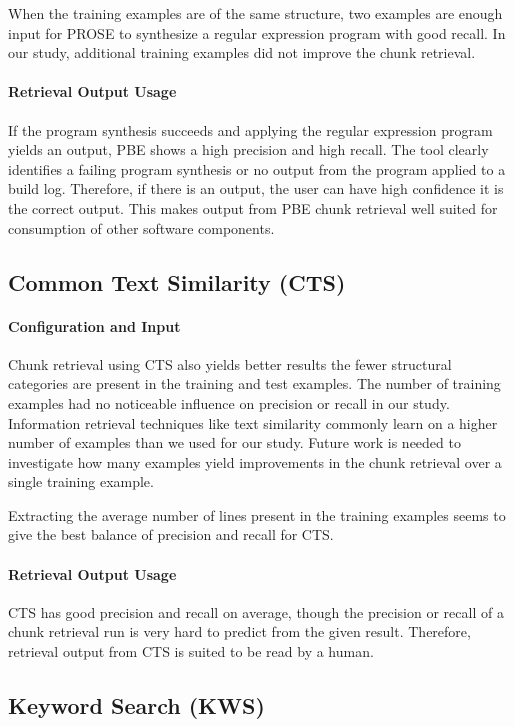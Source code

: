 \documentclass[\myrootdir/main.tex]{subfiles}
\begin{document}
When the training examples are of the same structure, two examples are enough input for PROSE to synthesize a regular expression program with good recall.
In our study, additional training examples did not improve the chunk retrieval.

\paragraph{Retrieval Output Usage}
If the program synthesis succeeds and applying the regular expression program yields an output, PBE shows a high precision and high recall.
The tool clearly identifies a failing program synthesis or no output from the program applied to a build log.
Therefore, if there is an output, the user can have high confidence it is the correct output.
This makes output from PBE chunk retrieval well suited for consumption of other software components.

\subsection{Common Text Similarity (CTS)}
\paragraph{Configuration and Input}
Chunk retrieval using CTS also yields better results the fewer structural categories are present in the training and test examples.
The number of training examples had no noticeable influence on precision or recall in our study.
Information retrieval techniques like text similarity commonly learn on a higher number of examples than we used for our study.
Future work is needed to investigate how many examples yield improvements in the chunk retrieval over a single training example.

Extracting the average number of lines present in the training examples seems to give the best balance of precision and recall for CTS\@.

\paragraph{Retrieval Output Usage}
CTS has good precision and recall on average, though the precision or recall of a chunk retrieval run is very hard to predict from the given result.
Therefore, retrieval output from CTS is suited to be read by a human.

\subsection{Keyword Search (KWS)}
\end{document}
